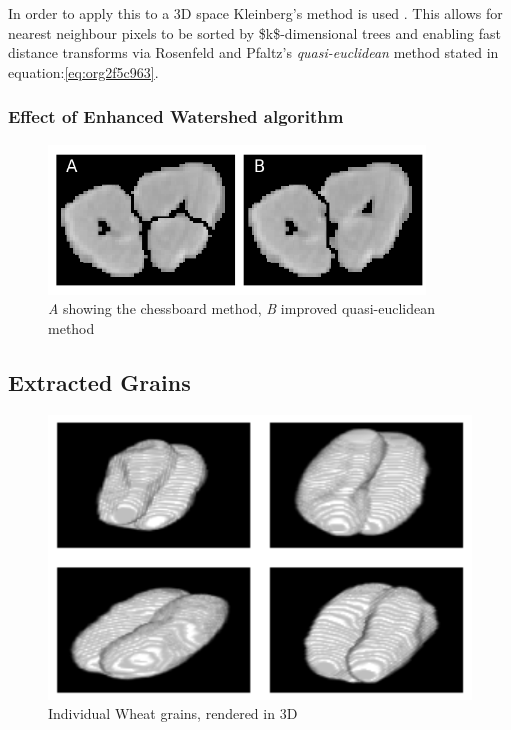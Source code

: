 \documentclass[11pt]{report}
\begin{document}
In order to apply this to a 3D space Kleinberg's method is used  \cite{Kleinberg1997}. This allows for nearest neighbour pixels to be sorted by \$k\$-dimensional trees
and enabling fast distance transforms via Rosenfeld and Pfaltz's \emph{quasi-euclidean} method stated in equation:\ref{eq:org2f5c963}.
\subsubsection{Effect of Enhanced Watershed algorithm}
\label{sec:org61b0c8d}
\begin{center}
\begin{figure}[htbp]
\centering
\includegraphics[width=10cm]{./images/chess_quasi.png}
\caption{\label{fig:org7ed182a}
\emph{A} showing the chessboard method, \emph{B} improved quasi-euclidean method}
\end{figure}
\end{center}

\subsection{Extracted Grains}
\label{sec:org5e1af20}

\begin{figure}[htbp]
\centering
\includegraphics[width=13cm]{./images/ctgrains.png}
\caption{\label{fig:orgb2e47c7}
Individual Wheat grains, rendered in 3D}
\end{figure}
\end{document}
